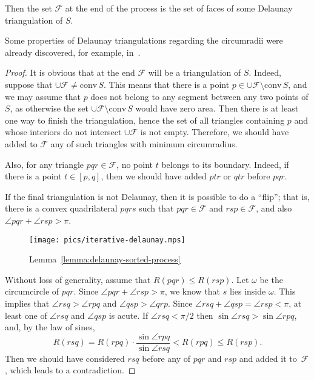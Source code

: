 \begin{appendices}
\begin{lemma}
Then the set $\mathcal{F}$ at the end of the process is the set of faces of some Delaunay triangulation of $S$.
\end{lemma}

\begin{remark}Some properties of Delaunay triangulations regarding the circumradii were already discovered, for example, in~\cite{Musin1997Delaunay}.
\end{remark}

\begin{proof}
It is obvious that at the end $\mathcal{F}$ will be a triangulation of $S$. Indeed, suppose that $\cup\mathcal{F}\neq\mathrm{conv}\,S$. This means that there is a point $p\in\cup\mathcal{F}\setminus\mathrm{conv}\,S$, and we may assume that $p$ does not belong to any segment between any two points of $S$, as otherwise the set $\cup\mathcal{F}\setminus\mathrm{conv}\,S$ would have zero area. Then there is at least one way to finish the triangulation, hence the set of all triangles containing $p$ and whose interiors do not intersect $\cup\mathcal{F}$ is not empty. Therefore, we should have added to $\mathcal{F}$ any of such triangles with minimum circumradius.

Also, for any triangle $pqr\in\mathcal{F}$, no point $t$ belongs to its boundary. Indeed, if there is a point $t\in [p, q]$, then we should have added $ptr$ or $qtr$ before $pqr$.

If the final triangulation is not Delaunay, then it is possible to do a ``flip''; that is, there is a convex quadrilateral $pqrs$ such that ${pqr}\in\mathcal{F}$ and ${rsp}\in\mathcal{F}$, and also $\angle{pqr} + \angle{rsp} > \pi$.

\begin{figure}[h!]
    \centering
    \texttt{[image: pics/iterative-delaunay.mps]}
    \caption{Lemma~\ref{lemma:delaunay-sorted-process}}
    \label{fig:delaunay-flip}
\end{figure}


Without loss of generality, assume that $R({pqr})\leq R({rsp})$. Let $\omega$ be the circumcircle of ${pqr}$. Since $\angle{pqr} + \angle{rsp} > \pi$, we know that $s$ lies inside $\omega$. This implies that $\angle{rsq} > \angle{rpq}$ and $\angle{qsp} > \angle{qrp}$. Since $\angle{rsq} + \angle{qsp} = \angle{rsp} < \pi$, at least one of $\angle{rsq}$ and $\angle{qsp}$ is acute. If $\angle{rsq} < \pi/2$ then $\sin\angle{rsq} > \sin\angle{rpq}$, and, by the law of sines,
$$R({rsq}) = R({rpq})\cdot\frac{\sin\angle{rpq}}{\sin\angle{rsq}} < R({rpq})\leq R({rsp}).$$
Then we should have considered ${rsq}$ before any of ${pqr}$ and ${rsp}$ and added it to~$\mathcal{F}$, which leads to a contradiction.


\end{proof}
\end{appendices}
